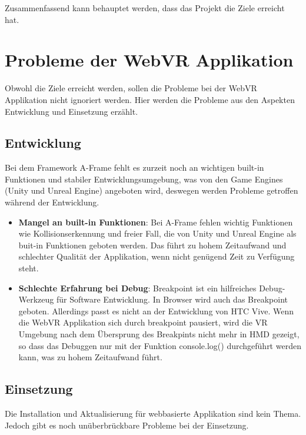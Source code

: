 Zusammenfassend kann behauptet werden, dass das Projekt die Ziele erreicht hat.

\section{Probleme der WebVR Applikation}
Obwohl die Ziele erreicht werden, sollen die Probleme bei der WebVR Applikation nicht ignoriert werden. Hier werden die Probleme aus den Aspekten Entwicklung und Einsetzung erzählt.

\subsection{Entwicklung}

Bei dem Framework A-Frame fehlt es zurzeit noch an wichtigen built-in Funktionen und stabiler Entwicklungsumgebung, was von den Game Engines (Unity und Unreal Engine) angeboten wird, deswegen werden Probleme getroffen während der Entwicklung. 

\begin{itemize}
    \item \textbf{Mangel an built-in Funktionen}: Bei A-Frame fehlen wichtig Funktionen wie Kollisionserkennung und freier Fall, die von Unity und Unreal Engine als buit-in Funktionen geboten werden. Das führt zu hohem Zeitaufwand und schlechter Qualität der Applikation, wenn nicht genügend Zeit zu Verfügung steht.
    
    \item \textbf{Schlechte Erfahrung bei Debug}: Breakpoint ist ein hilfreiches Debug-Werkzeug für Software Entwicklung. In Browser wird auch das Breakpoint geboten. Allerdings passt es nicht an der Entwicklung von HTC Vive. Wenn die WebVR Applikation sich durch breakpoint pausiert, wird die VR Umgebung nach dem Übersprung des Breakpints nicht mehr in HMD gezeigt, so dass das Debuggen nur mit der Funktion {\selectfont console.log()} durchgeführt werden kann, was zu hohem Zeitaufwand führt.
    
\end{itemize}

\subsection{Einsetzung}

Die Installation und Aktualisierung für webbasierte Applikation sind kein Thema. Jedoch gibt es noch unüberbrückbare Probleme bei der Einsetzung.


